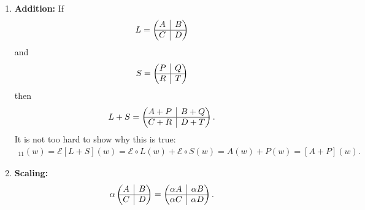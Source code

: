 \documentclass{article}
\theoremstyle{definition}
\newcommand{\E}{\mathcal{E}}
\newcommand{\rvline}{\hspace*{-\arraycolsep}\vline\hspace*{-\arraycolsep}}
\begin{document}
\begin{enumerate}
	\item \textbf{Addition:} If 
	\begin{align*}
	L = \begin{pmatrix}
	A & \rvline & B\\
	\hline
	C & \rvline & D
	\end{pmatrix}
	\end{align*}
	and
	\begin{align*}
	S = \begin{pmatrix}
	P & \rvline & Q\\
	\hline
	R & \rvline & T
	\end{pmatrix}
	\end{align*}
	then
	\begin{align*}
	L + S = \begin{pmatrix}
	A + P & \rvline & B+Q\\
	\hline
	C + R & \rvline & D + T
	\end{pmatrix}.
	\end{align*}
	It is not too hard to show why this is true:
	\begin{align*}
	[L+S]_{11}(w) = \E [L+S](w) = \E \circ L(w) + \E\circ S(w) = A(w) + P(w) = [A+P](w).
	\end{align*}
	
	
	
	\item \textbf{Scaling:}
	\begin{align*}
	\alpha \begin{pmatrix}
	A & \rvline & B\\
	\hline
	C & \rvline & D
	\end{pmatrix} = \begin{pmatrix}
	\alpha A & \rvline & \alpha B\\
	\hline
	\alpha C & \rvline & \alpha D
	\end{pmatrix}.
	\end{align*}
	

\end{enumerate}
\end{document}
